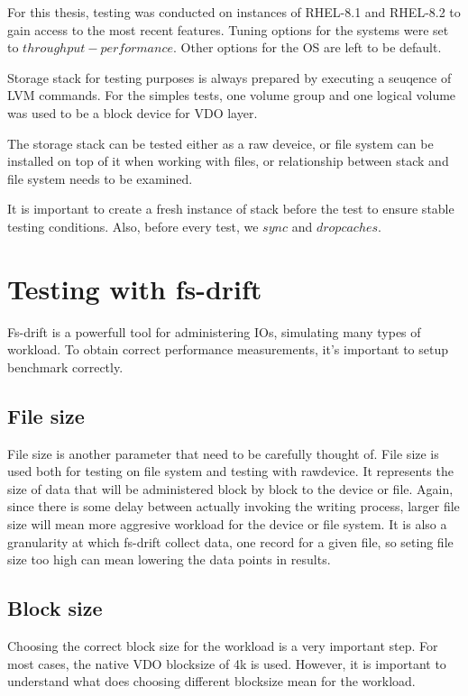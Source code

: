 \documentclass[
  color, %
  table, %
  lof,   %
  lot,   %
]{fithesis3}
\begin{document}
For this thesis, testing was conducted on instances of RHEL-8.1 and RHEL-8.2 to gain access to the most recent features. Tuning options for the systems were set to $throughput-performance$. Other options for the OS are left to be default.

Storage stack for testing purposes is always prepared by executing a seuqence of LVM commands. For the simples tests, one volume group and one logical volume was used to be a block device for VDO layer.

The storage stack can be tested either as a raw deveice, or file system can be installed on top of it when working with files, or relationship between stack and file system needs to be examined.

It is important to create a fresh instance of stack before the test to ensure stable testing conditions. Also, before every test, we $sync$ and $drop caches$. 

\section{Testing with fs-drift}
Fs-drift is a powerfull tool for administering IOs, simulating many types of workload. To obtain correct performance measurements, it's important to setup benchmark correctly.

\subsection{File size}
File size is another parameter that need to be carefully thought of. File size is used both for testing on file system and testing with rawdevice. It represents the size of data that will be administered block by block to the device or file. Again, since there is some delay between actually invoking the writing process, larger file size will mean more aggresive workload for the device or file system. It is also a granularity at which fs-drift collect data, one record for a given file, so seting file size too high can mean lowering the data points in results.

\subsection{Block size}
Choosing the correct block size for the workload is a very important step. For most cases, the native VDO blocksize of 4k is used. However, it is important to understand what does choosing different blocksize mean for the workload.
\end{document}
